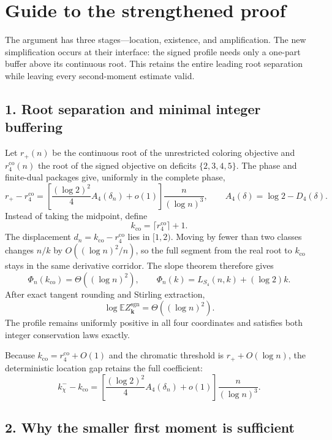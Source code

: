 \section*{Guide to the strengthened proof}
\label{sec:proof-architecture-near-root-v4}

The argument has three stages---location, existence, and amplification. The
new simplification occurs at their interface: the signed profile needs only a
one-part buffer above its continuous root. This retains the entire leading
root separation while leaving every second-moment estimate valid.

\subsection*{1. Root separation and minimal integer buffering}

Let $r_+(n)$ be the continuous root of the unrestricted coloring objective and
$r_4^{\mathrm{co}}(n)$ the root of the signed objective on deficits
$\{2,3,4,5\}$. The phase and finite-dual packages give, uniformly in the
complete phase,
\[
  r_+-r_4^{\mathrm{co}}
  =
  \left[
    \frac{(\log 2)^2}{4}A_4(\delta_n)+o(1)
  \right]
  \frac{n}{(\log n)^3},
  \qquad
  A_4(\delta)=\log 2-D_4(\delta).
\]
Instead of taking the midpoint, define
\[
  k_{\mathrm{co}}=\lceil r_4^{\mathrm{co}}\rceil+1.
\]
The displacement $d_n=k_{\mathrm{co}}-r_4^{\mathrm{co}}$ lies in $[1,2)$.
Moving by fewer than two classes changes $n/k$ by
$O((\log n)^2/n)$, so the full segment from the real root to
$k_{\mathrm{co}}$ stays in the same derivative corridor. The slope theorem
therefore gives
\[
  \Phi_n(k_{\mathrm{co}})
  =\Theta((\log n)^2),
  \qquad
  \Phi_n(k)=L_{S_4}(n,k)+(\log 2)k.
\]
After exact tangent rounding and Stirling extraction,
\[
  \log\mathbb E Z_{\mathbf k}^{\mathrm{sgn}}
  =\Theta((\log n)^2).
\]
The profile remains uniformly positive in all four coordinates and satisfies
both integer conservation laws exactly.

Because $k_{\mathrm{co}}=r_4^{\mathrm{co}}+O(1)$ and the chromatic threshold is
$r_++O(\log n)$, the deterministic location gap retains the full coefficient:
\[
  k_\chi^- - k_{\mathrm{co}}
  =
  \left[
    \frac{(\log 2)^2}{4}A_4(\delta_n)+o(1)
  \right]
  \frac{n}{(\log n)^3}.
\]

\subsection*{2. Why the smaller first moment is sufficient}

